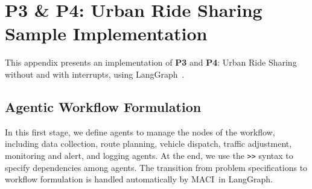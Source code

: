 \section{P3 \& P4: Urban Ride Sharing Sample Implementation}
\label{app:p3p4}

This appendix presents an implementation of \textbf{P3} and \textbf{P4}: Urban Ride Sharing without and with interrupts, using LangGraph~\cite{langgraph2024}.

\subsection{Agentic Workflow Formulation}

In this first stage, we define agents to manage the nodes of the workflow, including data collection, route planning, vehicle dispatch, traffic adjustment, monitoring and alert, and logging agents. At the end, we use the \texttt{>>} syntax to specify dependencies among agents. The transition from problem specifications to workflow formulation is handled automatically by MACI\,\cite{chang2025MACI} in LangGraph.

